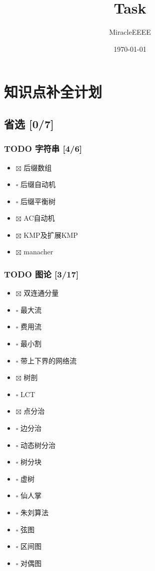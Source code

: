 \documentclass[11pt]{article}
\author{MiracleEEEE}
\date{\today}
\title{Task}
\begin{document}
\maketitle
\tableofcontents


\section{知识点补全计划}
\label{sec:org547ca53}
\subsection{省选 [0/7]}
\label{sec:orge862b86}
\subsubsection{{\bfseries\sffamily TODO} 字符串 [4/6]}
\label{sec:orgf6997c7}
\begin{itemize}
\item $\boxtimes$ 后缀数组
\item $\square$ 后缀自动机
\item $\square$ 后缀平衡树
\item $\boxtimes$ AC自动机
\item $\boxtimes$ KMP及扩展KMP
\item $\boxtimes$ manacher
\end{itemize}
\subsubsection{{\bfseries\sffamily TODO} 图论 [3/17]}
\label{sec:org037b9a8}

\begin{itemize}
\item $\boxtimes$ 双连通分量
\item $\square$ 最大流
\item $\square$ 费用流
\item $\square$ 最小割
\item $\square$ 带上下界的网络流
\item $\boxtimes$ 树剖
\item $\square$ LCT
\item $\boxtimes$ 点分治
\item $\square$ 边分治
\item $\square$ 动态树分治
\item $\square$ 树分块
\item $\square$ 虚树
\item $\square$ 仙人掌
\item $\square$ 朱刘算法
\item $\square$ 弦图
\item $\square$ 区间图
\item $\square$ 对偶图
\end{itemize}
\end{document}
